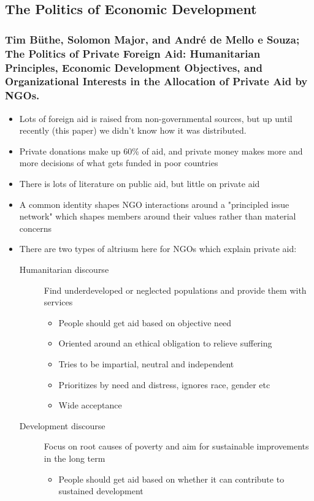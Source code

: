 \documentclass[11pt]{article}
\begin{document}
\subsection{The Politics of Economic Development}
\label{sec:org12accd4}
\subsubsection{Tim Büthe, Solomon Major, and André de Mello e Souza; The Politics of Private Foreign Aid: Humanitarian Principles, Economic Development Objectives, and Organizational Interests in the Allocation of Private Aid by NGOs.}
\label{sec:org8bc2ab8}
\begin{itemize}
\item Lots of foreign aid is raised from non-governmental sources, but up until
recently (this paper) we didn't know how it was distributed.
\item Private donations make up 60\% of aid, and private money makes more and more
decisions of what gets funded in poor countries
\item There is lots of literature on public aid, but little on private aid
\item A common identity shapes NGO interactions around a "principled issue network"
which shapes members around their values rather than material concerns
\item There are two types of altriusm here for NGOs which explain private aid:
\begin{description}
\item[{Humanitarian discourse}] Find underdeveloped or neglected populations and
provide them with services
\begin{itemize}
\item People should get aid based on objective need
\item Oriented around an ethical obligation to relieve suffering
\item Tries to be impartial, neutral and independent
\item Prioritizes by need and distress, ignores race, gender etc
\item Wide acceptance
\end{itemize}
\item[{Development discourse}] Focus on root causes of poverty and aim for
sustainable improvements in the long term
\begin{itemize}
\item People should get aid based on whether it can contribute to sustained
development

\end{itemize}
\end{description}
\end{itemize}
\end{document}
